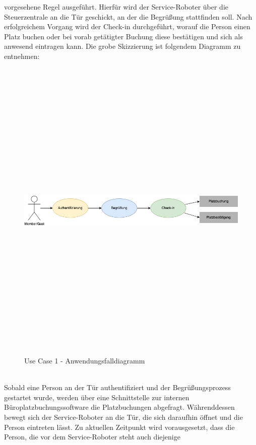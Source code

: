     vorgesehene Regel ausgeführt. Hierfür wird der Service-Roboter über die Steuerzentrale an die Tür geschickt, an der die Begrüßung 
    stattfinden soll. Nach erfolgreichem Vorgang wird der Check-in durchgeführt, worauf die Person einen Platz buchen oder bei vorab getätigter 
    Buchung diese bestätigen und sich als anwesend eintragen kann. Die grobe Skizzierung ist folgendem Diagramm zu entnehmen: 
    \begin{figure}[hbt!]
        \centering
        \includegraphics[width=15cm,height=15cm,keepaspectratio]{images/UC1_Diagramm_Check-in.png}
        \caption{Use Case 1 - Anwendungsfalldiagramm}
        \label{fig:uc1-check-in}
    \end{figure}
    \\
    \linebreak
    Sobald eine Person an der Tür authentifiziert und der Begrüßungsprozess gestartet wurde, werden über eine 
    Schnittstelle zur internen Büroplatzbuchungssoftware die Platzbuchungen abgefragt. Währenddessen bewegt sich der 
    Service-Roboter an die Tür, die sich daraufhin öffnet und die Person eintreten lässt. 
    Zu aktuellen Zeitpunkt wird vorausgesetzt, dass die Person, die vor dem Service-Roboter steht auch diejenige 
